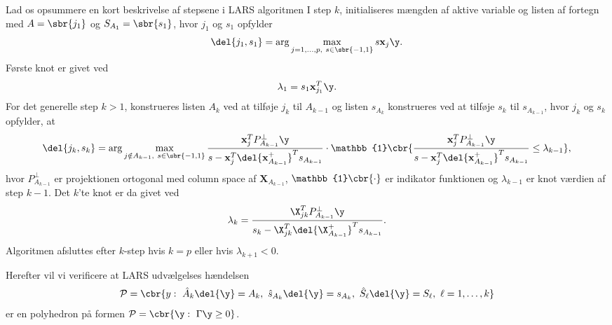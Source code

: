 Lad os opsummere en kort beskrivelse af stepsene i LARS algoritmen
I step \(k\), initialiseres mængden af aktive variable og listen af fortegn med \(A=\sbr{j_1}\) og \(S_{A_1} = \sbr{s_1}\), hvor \(j_1\) og \(s_1\) opfylder
\begin{align}
\del{j_1, s_1} = \arg \max_{j=1,\ldots, p, \ s \in \sbr{-1,1}} s \mathbf{x}_j \y. \label{eq:polyhedron_rep_LARS1}
\end{align}
Første knot er givet ved
\begin{align*}
\lambda_1 = s_1 \mathbf{x}_{j_1}^T \y.
\end{align*}
For det generelle step \(k > 1\), konstrueres listen \(A_k\) ved at tilføje \(j_k\) til \(A_{k-1}\) og listen \(s_{A_k}\) konstrueres ved at tilføje \(s_k\) til \(s_{A_{k-1}}\), hvor \(j_k\) og \(s_k\) opfylder, at
\begin{align}
\del{j_k, s_k} = \arg \max_{j \notin A_{k-1} , \ s \in \sbr{-1,1}} \frac{\mathbf{x}_j^T P_{A_{k-1}}^\perp \y}{s - \mathbf{x}_j^T \del{\mathbf{x}_{A_{k-1}}^+}^T s_{A_{k-1}}} \cdot \mathbb{1} \cbr{\frac{\mathbf{x}_j^T P_{A_{k-1}}^\perp \y}{s - \mathbf{x}_j^T \del{\mathbf{x}_{A_{k-1}}^+}^T s_{A_{k-1}}} \leq \lambda_{k-1}}, \label{eq:polyhedron_rep_LARS2}
\end{align}
hvor \(P_{A_{k-1}}^\perp \) er projektionen ortogonal med column space af \(\mathbf{X}_{A_{k-1}}\), \(\mathbb{1} \cbr{\cdot}\) er indikator funktionen og \(\lambda_{k-1}\) er knot værdien af step \(k-1\).
Det \(k\)'te knot er da givet ved
\begin{align}
\lambda_k = \frac{\X_{jk}^T P_{A_{k-1}}^\perp \y}{s_k - \X_{jk}^T \del{\X_{A_{k-1}}^+}^T s_{A_{k-1}}}. \label{eq:polyhedron_rap_LARS3}
\end{align}
Algoritmen afsluttes efter \(k\)-step hvis \(k=p\) eller hvis \(\lambda_{k+1} < 0\).

Herefter vil vi verificere at LARS udvælgelses hændelsen
\begin{align}
\mathcal{P} = \cbr{y: \ \hat{A}_k \del{\y} = A_k, \ \hat{s}_{A_k} \del{\y} = s_{A_k}, \ \hat{S}_\ell \del{\y} = S_\ell, \ \ell = 1, \ldots, k} \label{eq:polyhedron_rep_LARS}
\end{align}
er en polyhedron på formen \(\mathcal{P} = \cbr{\y : \ \Gamma \y \geq 0}\).

